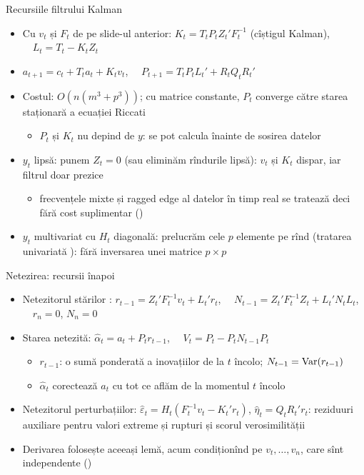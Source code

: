 \begin{frame}{Recursiile filtrului Kalman}
\itemsize{\small}
\begin{itemize}
    \item Cu $v_t$ și $F_t$ de pe slide-ul anterior: $K_t = T_tP_tZ_t'F_t^{-1}$ (cîștigul Kalman), $\quad L_t = T_t - K_tZ_t$
    \item $a_{t+1} = c_t + T_ta_t + K_tv_t$, $\quad P_{t+1} = T_tP_tL_t' + R_tQ_tR_t'$
    \item Costul: $O(n(m^3 + p^3))$; cu matrice constante, $P_t$ converge către starea staționară a ecuației Riccati
    \begin{itemize}
        \item $P_t$ și $K_t$ nu depind de $y$: se pot calcula înainte de sosirea datelor
    \end{itemize}
    \item $y_t$ lipsă: punem $Z_t = 0$ (sau eliminăm rîndurile lipsă): $v_t$ și $K_t$ dispar, iar filtrul doar prezice
    \begin{itemize}
        \item frecvențele mixte și ragged edge al datelor în timp real se tratează deci fără cost suplimentar ()
    \end{itemize}
    \item $y_t$ multivariat cu $H_t$ diagonală: prelucrăm cele $p$ elemente pe rînd (tratarea univariată ): fără inversarea unei matrice $p\times p$
\end{itemize}
\end{frame}

\begin{frame}{Netezirea: recursii înapoi}
\itemsize{\small}
\begin{itemize}
    \item Netezitorul stărilor : $r_{t-1} = Z_t'F_t^{-1}v_t + L_t'r_t$, $\quad N_{t-1} = Z_t'F_t^{-1}Z_t + L_t'N_tL_t$, $\quad r_n = 0$, $N_n = 0$
    \item Starea netezită: $\hat\alpha_t = a_t + P_tr_{t-1}$, $\quad V_t = P_t - P_tN_{t-1}P_t$
    \begin{itemize}
        \item $r_{t-1}$: o sumă ponderată a inovațiilor de la $t$ încolo; $N_{t-1} = \text{Var}(r_{t-1})$
        \item $\hat\alpha_t$ corectează $a_t$ cu tot ce aflăm de la momentul $t$ încolo
    \end{itemize}
    \item Netezitorul perturbațiilor: $\hat\varepsilon_t = H_t(F_t^{-1}v_t - K_t'r_t)$, $\hat\eta_t = Q_tR_t'r_t$: reziduuri auxiliare pentru valori extreme și rupturi și scorul verosimilității
    \item Derivarea folosește aceeași lemă, acum condiționînd pe $v_t, \dots, v_n$, care sînt independente ()  %
\end{itemize}
\end{frame}

